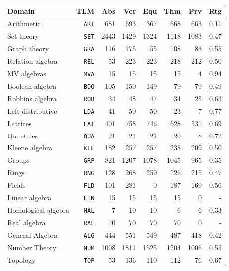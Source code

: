 \documentclass[runningheads]{llncs}
\begin{document}
\begin{table}[tb]
\begin{center}
\setlength{\tabcolsep}{4pt}
\begin{tabular}{lr|rr|rrrr}
Domain              & TLM       & Abs  & Ver  & Equ  & Thm  & Prv  & Rtg \\
\hline
Arithmetic          & {\tt ARI} &  681 &  693 &  367 &  668 &  663 & 0.11 \\
Set theory          & {\tt SET} & 2443 & 1429 & 1324 & 1118 & 1083 & 0.47 \\
Graph theory        & {\tt GRA} &  116 &  175 &   55 &  108 &   83 & 0.55 \\
Relation algebra    & {\tt REL} &   53 &  223 &  223 &  218 &  212 & 0.50 \\
MV algebras         & {\tt MVA} &   15 &   15 &   15 &   15 &    4 & 0.94 \\
Boolean algebra     & {\tt BOO} &  105 &  150 &  149 &   79 &   79 & 0.49 \\
Robbins algebra     & {\tt ROB} &   34 &   48 &   47 &   34 &   25 & 0.63 \\
Left distributive   & {\tt LDA} &   41 &   50 &   50 &   23 &    7 & 0.77 \\
Lattices            & {\tt LAT} &  401 &  758 &  746 &  628 &  531 & 0.69 \\
Quantales           & {\tt QUA} &   21 &   21 &   21 &   20 &    8 & 0.72 \\
Kleene algebra      & {\tt KLE} &  182 &  257 &  257 &  238 &  209 & 0.50 \\
Groups              & {\tt GRP} &  821 & 1207 & 1078 & 1045 &  965 & 0.35 \\
Rings               & {\tt RNG} &  128 &  268 &  259 &  226 &  215 & 0.47 \\
Fields              & {\tt FLD} &  101 &  281 &    0 &  187 &  169 & 0.56 \\
Linear algebra      & {\tt LIN} &   15 &   15 &   15 &   15 &    0 & -    \\
Homological algebra & {\tt HAL} &    7 &   10 &   10 &    6 &    6 & 0.33 \\
Real algebra        & {\tt RAL} &   70 &   70 &   70 &   70 &    0 & -    \\
General Algebra     & {\tt ALG} &  444 &  551 &  549 &  487 &  418 & 0.42 \\
Number Theory       & {\tt NUM} & 1008 & 1811 & 1525 & 1204 & 1006 & 0.55 \\
Topology            & {\tt TOP} &   53 &  136 &  110 &  112 &   76 & 0.67 \\

\end{tabular}
\end{center}
\end{table}
\end{document}
